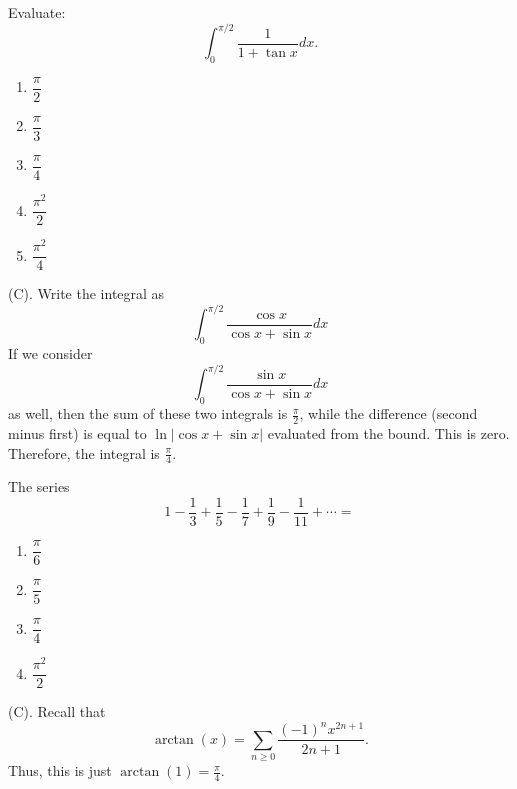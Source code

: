 \begin{exercise}
Evaluate: 
\[
\int_0^{\pi/2}\frac{1}{1+\tan x} dx.
\]
\begin{enumerate}[label=(\Alph*)]
    \item $\dfrac{\pi}{2}$
    \item $\dfrac{\pi}{3}$
    \item $\dfrac{\pi}{4}$
    \item $\dfrac{\pi^2}{2}$
    \item $\dfrac{\pi^2}{4}$
\end{enumerate}
\end{exercise}
\begin{solution}
(C). Write the integral as
\[
\int_0^{\pi/2}\frac{\cos x}{\cos x+ \sin x} dx
\]
If we consider 
\[
\int_0^{\pi/2}\frac{\sin x}{\cos x+ \sin x} dx
\]
as well, then the sum of these two integrals is $\frac{\pi}{2}$, while the 
difference (second minus first) is equal to $\ln |\cos x + \sin x|$ evaluated
from the bound. This is zero. Therefore, the integral is $\frac{\pi}{4}$.
\end{solution}

\begin{exercise}
The series
\[
1-\frac{1}{3}+\frac{1}{5}-\frac{1}{7}+\frac{1}{9}-\frac{1}{11}+\cdots
=
\]
\begin{enumerate}[label=(\Alph*)]
    \item $\dfrac{\pi}{6}$
    \item $\dfrac{\pi}{5}$
    \item $\dfrac{\pi}{4}$
    \item $\dfrac{\pi^2}{2}$
\end{enumerate}
\end{exercise}
\begin{solution}
(C). Recall that 
\[
\arctan (x) = \sum_{n \geq 0} \frac{(-1)^nx^{2n + 1}}{2n + 1}.
\]
Thus, this is just $\arctan(1) = \frac{\pi}{4}$.
\end{solution}

